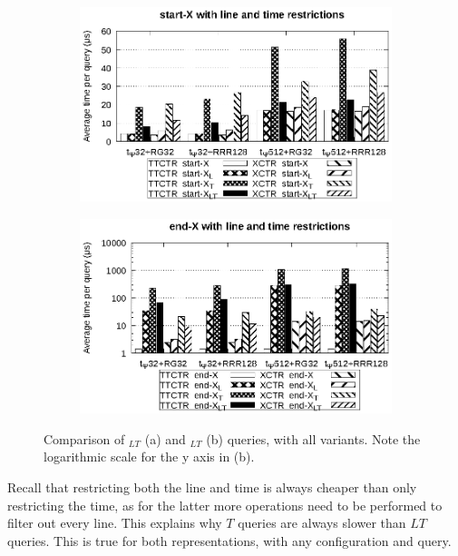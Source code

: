     \begin{figure}[ht]
    \begin{subfigure}{0.5\linewidth}
    \includegraphics[width=\linewidth]{experiments/start.eps}
    \vspace{-12pt}
    \caption{}
    \vspace{-12pt}
    \end{subfigure}%
    \begin{subfigure}{0.5\linewidth}
    \includegraphics[width=\linewidth]{experiments/end.eps}
    \vspace{-12pt}
    \caption{}
    \vspace{-12pt}
    \end{subfigure}
    \caption{Comparison of \texttt{\startX$_{LT}$} (a) and \texttt{\endX$_{LT}$} (b) queries, with all variants. Note the logarithmic scale for the y axis in (b).}
    \label{fig:start}
    \end{figure}
    
    Recall that restricting both the line and time is always cheaper than only restricting the time, as for the latter more operations need to be performed to filter out every line. This explains why $T$ queries are always slower than $LT$ queries. This is true for both representations, with any configuration and query.
    
